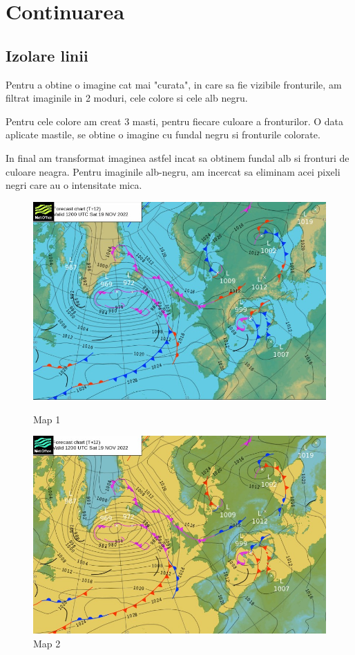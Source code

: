 \documentclass{article}
\begin{document}
\newpage

\section{Continuarea}

\subsection{Izolare linii}

Pentru a obtine o imagine cat mai "curata", in care sa fie vizibile fronturile, am filtrat imaginile in 2 moduri, cele colore si cele alb negru. 

Pentru cele colore am creat 3 masti, pentru fiecare culoare a fronturilor. O data aplicate mastile, se obtine o imagine cu fundal negru si fronturile colorate. 

In final am transformat imaginea astfel incat sa obtinem fundal alb si fronturi de culoare neagra. Pentru imaginile alb-negru, am incercat sa eliminam acei pixeli negri care au o intensitate mica.

\begin{figure}[!htb]
   \begin{minipage}{0.48\textwidth}
     \centering
     \includegraphics[width=.7\linewidth]{map1.jpg}
     \caption{Map 1}\label{Fig:Data1}
   \end{minipage}\hfill
   \begin{minipage}{0.48\textwidth}
     \centering
     \includegraphics[width=.7\linewidth]{map2.jpg}
     \caption{Map 2}\label{Fig:Data2}
   \end{minipage}
\end{figure}
\end{document}
